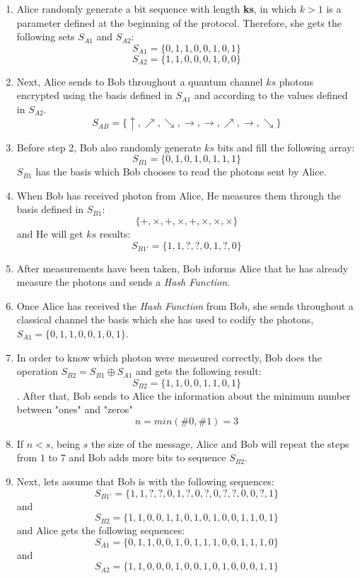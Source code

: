 \begin{enumerate}
  \item Alice randomly generate a bit sequence with length \textbf{ks}, in which $k>1$ is a parameter defined at the beginning of the protocol.
      Therefore, she gets the following sets $S_{A1}$ and $S_{A2}$:
      $$S_{A1} = \{0,1,1,0,0,1,0,1 \}$$
      $$S_{A2} = \{1,1,0,0,0,1,0,0 \}$$

  \item Next, Alice sends to Bob throughout a quantum channel $ks$ photons encrypted using the basis defined in $S_{A1}$ and according to the values defined in $S_{A2}$.
      $$S_{AB} = \{\uparrow, \nearrow, \searrow, \to, \to, \nearrow, \to, \searrow \}$$

  \item Before step 2, Bob also randomly generate $ks$ bits and fill the following array:
  $$S_{B1} = \{0,1,0,1,0,1,1,1 \}$$
  $S_{B1}$ has the basis which Bob chooses to read the photons sent by Alice.

  \item When Bob has received photon from Alice, He measures them through the basis defined in $S_{B1}$:
  $$\{ +,\times,+,\times,+,\times, \times, \times \}$$ and He will get $ks$ results:
  $$S_{B1\prime} = \{1,1,?,?,0,1,?,0 \}$$

  \item After measurements have been taken, Bob informs Alice that he has already measure the photons and sends a \textit{Hash Function}.

  \item Once Alice has received the \textit{Hash Function} from Bob, she sends throughout a classical channel the basis which she has used to codify the photons, $S_{A1} = \{0,1,1,0,0,1,0,1\}$.

  \item In order to know which photon were measured correctly, Bob does the operation $S_{B2}=S_{B1} \oplus S_{A1}$ and gets the following result: $$S_{B2} = \{1,1,0,0,1,1,0,1 \}$$.
      After that, Bob sends to Alice the information about the minimum number between "ones" and "zeros" $$n=min(\#0,\#1)=3$$

  \item If $n<s$, being $s$ the size of the message, Alice and Bob will repeat the steps from $1$ to $7$ and Bob adds more bits to sequence $S_{B2}$.

  \item Next, lets assume that Bob is with the following sequences: $$S_{B1\prime}= \{1,1,?,?,0,1,?,0,?,0,?,?,0,0,?,1 \}$$ and $$S_{B2}= \{1,1,0,0,1,1,0,1,0,1,0,0,1,1,0,1 \}$$ and Alice gets the following sequences: $$S_{A1}=\{0,1,1,0,0,1,0,1,1,1,0,0,1,1,1,0 \}$$ and $$S_{A2}=\{1,1,0,0,0,1,0,0,1,0,1,0,0,0,1,1 \}$$


\end{enumerate}
